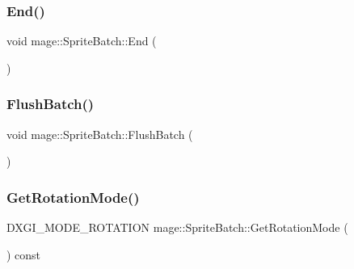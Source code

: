 \hypertarget{classmage_1_1_sprite_batch_a9764372bb18b1c24a4a2f64ab0649569}{}\label{classmage_1_1_sprite_batch_a9764372bb18b1c24a4a2f64ab0649569} 
\subsubsection{\texorpdfstring{End()}{End()}}
{\footnotesize\ttfamily void mage\+::\+Sprite\+Batch\+::\+End (\begin{DoxyParamCaption}{ }\end{DoxyParamCaption})}

\hypertarget{classmage_1_1_sprite_batch_a352714b5d02590245ab8ffe8489305f7}{}\label{classmage_1_1_sprite_batch_a352714b5d02590245ab8ffe8489305f7} 
\subsubsection{\texorpdfstring{Flush\+Batch()}{FlushBatch()}}
{\footnotesize\ttfamily void mage\+::\+Sprite\+Batch\+::\+Flush\+Batch (\begin{DoxyParamCaption}{ }\end{DoxyParamCaption})\hspace{0.3cm}{\ttfamily [private]}}

\hypertarget{classmage_1_1_sprite_batch_ade698c44432d175ca55a4545b9adae85}{}\label{classmage_1_1_sprite_batch_ade698c44432d175ca55a4545b9adae85} 
\subsubsection{\texorpdfstring{Get\+Rotation\+Mode()}{GetRotationMode()}}
{\footnotesize\ttfamily D\+X\+G\+I\+\_\+\+M\+O\+D\+E\+\_\+\+R\+O\+T\+A\+T\+I\+ON mage\+::\+Sprite\+Batch\+::\+Get\+Rotation\+Mode (\begin{DoxyParamCaption}{ }\end{DoxyParamCaption}) const}

\hypertarget{classmage_1_1_sprite_batch_a67bdd7fb00644aefb3c7ecfaa7923a39}{}\label{classmage_1_1_sprite_batch_a67bdd7fb00644aefb3c7ecfaa7923a39} 
